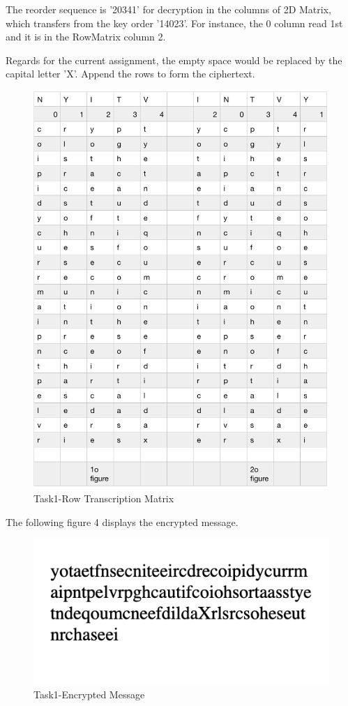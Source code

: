 \documentclass[twoside,twocolumn]{article}
\begin{document}
The reorder sequence is '20341' for decryption in the columns of 2D Matrix, which transfers from the key order '14023'. For instance, the 0 column read 1st and it is in the RowMatrix column 2.


Regards for the current assignment, the empty space would be replaced by the capital letter 'X'.  Append the rows to form the ciphertext.\\

\begin{figure}[H]
  \centering
  \includegraphics[scale=0.4]{./Graphs/Figure1.2.png}
  \caption{Task1-Row Transcription Matrix}
  \label{fig:testfig1}
\end{figure}


The following figure 4 displays the encrypted message.

\begin{figure}[H]
  \centering
  \includegraphics[scale=0.75]{./Graphs/Figure1.4.png}
  \caption{Task1-Encrypted Message}
  \label{fig:testfig1}
\end{figure}
\end{document}
